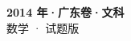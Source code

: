 \documentclass[zihao=-4, a4paper]{ctexart}
\begin{document}
\begin{center}
  {\Large\bfseries 2014 年·广东卷·文科}\\[4pt]
  {\large 数学 · 试题版}
\end{center}
\medskip
{}

\end{document}
